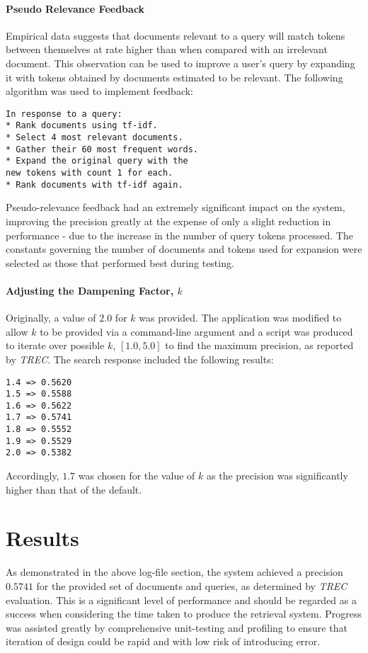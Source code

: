 \documentclass[11pt, a4paper, twocolumn]{article}   	%
\begin{document}
\paragraph{Pseudo Relevance Feedback}
Empirical data suggests that documents relevant to a query will match tokens between themselves at rate higher than when compared with an irrelevant document. This observation can be used to improve a user's query by expanding it with tokens obtained by documents estimated to be relevant.
The following algorithm was used to implement feedback:
\begin{verbatim}
In response to a query:
* Rank documents using tf-idf.
* Select 4 most relevant documents.
* Gather their 60 most frequent words.
* Expand the original query with the
new tokens with count 1 for each.
* Rank documents with tf-idf again.
\end{verbatim}
Pseudo-relevance feedback had an extremely significant impact on the system, improving the precision greatly at the expense of only a slight reduction in performance - due to the increase in the number of query tokens processed. The constants governing the number of documents and tokens used for expansion were selected as those that performed best during testing.

\paragraph{Adjusting the Dampening Factor, $k$}
Originally, a value of $2.0$ for $k$ was provided. The application was modified to allow $k$ to be provided via a command-line argument and a script was produced to iterate over possible $k$, $[1.0, 5.0]$ to find the maximum precision, as reported by \emph{TREC}.
The search response included the following results:
\begin{verbatim}
1.4 => 0.5620
1.5 => 0.5588
1.6 => 0.5622
1.7 => 0.5741
1.8 => 0.5552
1.9 => 0.5529
2.0 => 0.5382
\end{verbatim}
Accordingly, $1.7$ was chosen for the value of $k$ as the precision was significantly higher than that of the default.
\section{Results}
As demonstrated in the above log-file section, the system achieved a precision $0.5741$ for the provided set of documents and queries, as determined by \emph{TREC} evaluation.
This is a significant level of performance and should be regarded as a success when considering the time taken to produce the retrieval system. Progress was assisted greatly by comprehensive unit-testing and profiling to ensure that iteration of design could be rapid and with low risk of introducing error.
\end{document}

